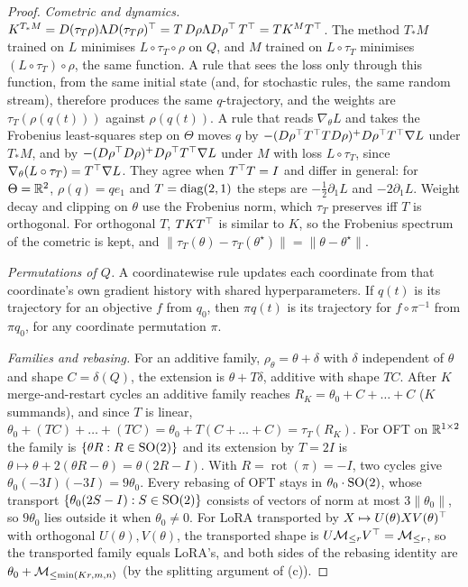 \begin{proof}
\emph{Cometric and dynamics.} $K^{T_*M}=D(\tau_T\rho)\Lambda D(\tau_T\rho)^{\top}=T\,D\rho\Lambda D\rho^{\top}\,T^{\top}=TK^MT^{\top}$. The method $T_*M$
trained on $L$ minimises $L\circ\tau_T\circ\rho$ on $Q$, and $M$ trained on $L\circ\tau_T$ minimises $(L\circ\tau_T)\circ\rho$,
the same function. A rule that sees the loss only through this function, from the same initial state (and, for stochastic
rules, the same random stream), therefore produces the same $q$-trajectory, and the weights are $\tau_T(\rho(q(t)))$ against
$\rho(q(t))$. A rule that reads $\nabla_\theta L$ and takes the Frobenius least-squares step on $\Theta$ moves $q$ by
$-(D\rho^{\top} T^{\top} TD\rho)^+D\rho^{\top} T^{\top}\nabla L$ under $T_*M$, and by $-(D\rho^{\top} D\rho)^+D\rho^{\top} T^{\top}\nabla L$ under $M$ with loss
$L\circ\tau_T$, since $\nabla_\theta(L\circ\tau_T)=T^{\top}\nabla L$. They agree when $T^{\top} T=I$ and differ in general: for
$\Theta=\mathbb{R}^2$, $\rho(q)=qe_1$ and $T=\operatorname{diag}(2,1)$ the steps are $-\tfrac12\partial_1L$ and $-2\partial_1L$. Weight decay and
clipping on $\theta$ use the Frobenius norm, which $\tau_T$ preserves iff $T$ is orthogonal. For orthogonal $T$,
$TKT^{\top}$ is similar to $K$, so the Frobenius spectrum of the cometric is kept, and $\lVert\tau_T(\theta)-\tau_T(\theta^\star)
\rVert=\lVert\theta-\theta^\star\rVert$.

\emph{Permutations of $Q$.} A coordinatewise rule updates each coordinate from that coordinate's own gradient history with
shared hyperparameters. If $q(t)$ is its trajectory for an objective $f$ from $q_0$, then $\pi q(t)$ is its trajectory for
$f\circ\pi^{-1}$ from $\pi q_0$, for any coordinate permutation $\pi$.

\emph{Families and rebasing.} For an additive family, $\rho_\theta=\theta+\delta$ with $\delta$ independent of $\theta$ and
shape $C=\delta(Q)$, the extension is $\theta+T\delta$, additive with shape $TC$. After $K$ merge-and-restart cycles an
additive family reaches $R_K=\theta_0+C+\dots+C$ ($K$ summands), and since $T$ is linear,
$\theta_0+(TC)+\dots+(TC)=\theta_0+T(C+\dots+C)=\tau_T(R_K)$. For OFT on $\mathbb{R}^{1\times2}$ the family is
$\{\theta R:R\in\mathrm{SO}(2)\}$ and its extension by $T=2I$ is $\theta\mapsto\theta+2(\theta R-\theta)=\theta(2R-I)$. With
$R=\operatorname{rot}(\pi)=-I$, two cycles give $\theta_0(-3I)(-3I)=9\theta_0$. Every rebasing of OFT stays in
$\theta_0\cdot\mathrm{SO}(2)$, whose transport $\{\theta_0(2S-I):S\in\mathrm{SO}(2)\}$ consists of vectors of norm at most $3\lVert\theta_0\rVert$,
so $9\theta_0$ lies outside it when $\theta_0\ne0$. For LoRA transported by $X\mapsto U(\theta)XV(\theta)^{\top}$ with orthogonal
$U(\theta),V(\theta)$, the transported shape is $U\mathcal{M}_{\le r} V^{\top}=\mathcal{M}_{\le r}$, so the transported family equals LoRA's, and both sides of
the rebasing identity are $\theta_0+\mathcal{M}_{\le\min(Kr,m,n)}$ (by the splitting argument of (c)).


\end{proof}
